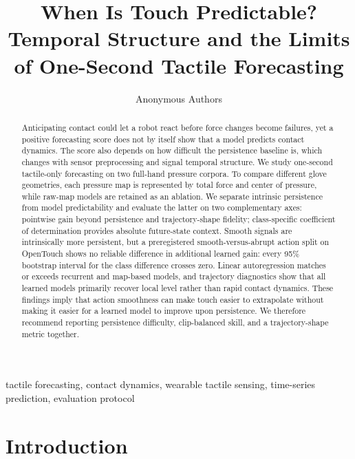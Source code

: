 \documentclass[letterpaper, 10 pt, conference]{ieeeconf}
\begin{document}
\title{\LARGE \bf
When Is Touch Predictable? Temporal Structure and the Limits of One-Second Tactile Forecasting
}

\author{Anonymous Authors}

\maketitle
\thispagestyle{empty}
\pagestyle{empty}

\begin{abstract}
Anticipating contact could let a robot react before force changes become failures, yet a positive forecasting score does not by itself show that a model predicts contact dynamics. The score also depends on how difficult the persistence baseline is, which changes with sensor preprocessing and signal temporal structure. We study one-second tactile-only forecasting on two full-hand pressure corpora. To compare different glove geometries, each pressure map is represented by total force and center of pressure, while raw-map models are retained as an ablation. We separate intrinsic persistence from model predictability and evaluate the latter on two complementary axes: pointwise gain beyond persistence and trajectory-shape fidelity; class-specific coefficient of determination provides absolute future-state context. Smooth signals are intrinsically more persistent, but a preregistered smooth-versus-abrupt action split on OpenTouch shows no reliable difference in additional learned gain: every 95\% bootstrap interval for the class difference crosses zero. Linear autoregression matches or exceeds recurrent and map-based models, and trajectory diagnostics show that all learned models primarily recover local level rather than rapid contact dynamics. These findings imply that action smoothness can make touch easier to extrapolate without making it easier for a learned model to improve upon persistence. We therefore recommend reporting persistence difficulty, clip-balanced skill, and a trajectory-shape metric together.
\end{abstract}

\begin{keywords}
tactile forecasting, contact dynamics, wearable tactile sensing, time-series prediction, evaluation protocol
\end{keywords}

\section{Introduction}
\label{sec:introduction}
\end{document}

